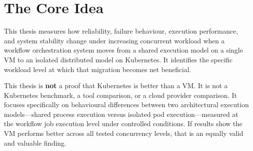 
\section{The Core Idea}
\label{sec:core-idea}

This thesis measures how reliability, failure behaviour, execution performance, and system stability change under increasing concurrent workload when a workflow orchestration system moves from a shared execution model on a single VM to an isolated distributed model on Kubernetes. It identifies the specific workload level at which that migration becomes net beneficial.

This thesis is \textbf{not} a proof that Kubernetes is better than a VM. It is not a Kubernetes benchmark, a tool comparison, or a cloud provider comparison. It focuses specifically on behavioural differences between two architectural execution models---shared process execution versus isolated pod execution---measured at the workflow job execution level under controlled conditions. If results show the VM performs better across all tested concurrency levels, that is an equally valid and valuable finding.
